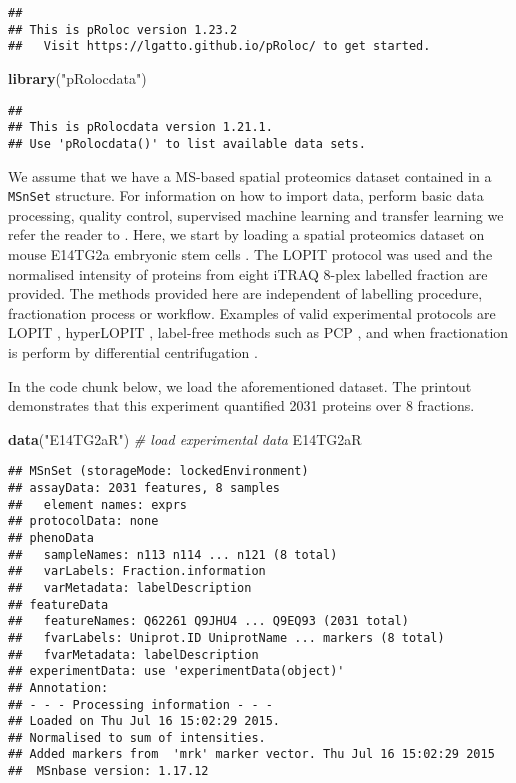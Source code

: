 \documentclass[9pt,a4paper,]{extarticle}
\newenvironment{Shaded}{\begin{snugshade}}{\end{snugshade}}
\newcommand{\CommentTok}[1]{\textcolor[rgb]{0.56,0.35,0.01}{\textit{#1}}}
\newcommand{\KeywordTok}[1]{\textcolor[rgb]{0.13,0.29,0.53}{\textbf{#1}}}
\newcommand{\NormalTok}[1]{#1}
\newcommand{\StringTok}[1]{\textcolor[rgb]{0.31,0.60,0.02}{#1}}
\begin{document}
\begin{verbatim}
## 
## This is pRoloc version 1.23.2 
##   Visit https://lgatto.github.io/pRoloc/ to get started.
\end{verbatim}

\begin{Shaded}
\begin{Highlighting}[]
\KeywordTok{library}\NormalTok{(}\StringTok{"pRolocdata"}\NormalTok{)}
\end{Highlighting}
\end{Shaded}

\begin{verbatim}
## 
## This is pRolocdata version 1.21.1.
## Use 'pRolocdata()' to list available data sets.
\end{verbatim}

We assume that we have a MS-based spatial proteomics dataset contained
in a \texttt{MSnSet} structure. For information on how to import data,
perform basic data processing, quality control, supervised machine
learning and transfer learning we refer the reader to
\citep{Breckels:2016b}. Here, we start by loading a spatial proteomics dataset
on mouse E14TG2a embryonic stem cells \citep{Breckels:2016}. The LOPIT protocol
\citep{Dunkley:2004, Dunkley:2006} was used and the normalised intensity of
proteins from eight iTRAQ 8-plex labelled fraction are provided. The
methods provided here are independent of labelling procedure,
fractionation process or workflow. Examples of valid experimental
protocols are LOPIT \citep{Dunkley:2004}, hyperLOPIT \citep{hyper, Mulvey:2017},
label-free methods such as PCP \citep{Foster:2006}, and when fractionation
is perform by differential centrifugation \citep{Itzhak:2016, DC:2018}.

In the code chunk below, we load the aforementioned dataset. The
printout demonstrates that this experiment quantified 2031 proteins
over 8 fractions.

\begin{Shaded}
\begin{Highlighting}[]
\KeywordTok{data}\NormalTok{(}\StringTok{"E14TG2aR"}\NormalTok{) }\CommentTok{# load experimental data}
\NormalTok{E14TG2aR}
\end{Highlighting}
\end{Shaded}

\begin{verbatim}
## MSnSet (storageMode: lockedEnvironment)
## assayData: 2031 features, 8 samples 
##   element names: exprs 
## protocolData: none
## phenoData
##   sampleNames: n113 n114 ... n121 (8 total)
##   varLabels: Fraction.information
##   varMetadata: labelDescription
## featureData
##   featureNames: Q62261 Q9JHU4 ... Q9EQ93 (2031 total)
##   fvarLabels: Uniprot.ID UniprotName ... markers (8 total)
##   fvarMetadata: labelDescription
## experimentData: use 'experimentData(object)'
## Annotation:  
## - - - Processing information - - -
## Loaded on Thu Jul 16 15:02:29 2015. 
## Normalised to sum of intensities. 
## Added markers from  'mrk' marker vector. Thu Jul 16 15:02:29 2015 
##  MSnbase version: 1.17.12
\end{verbatim}
\end{document}
